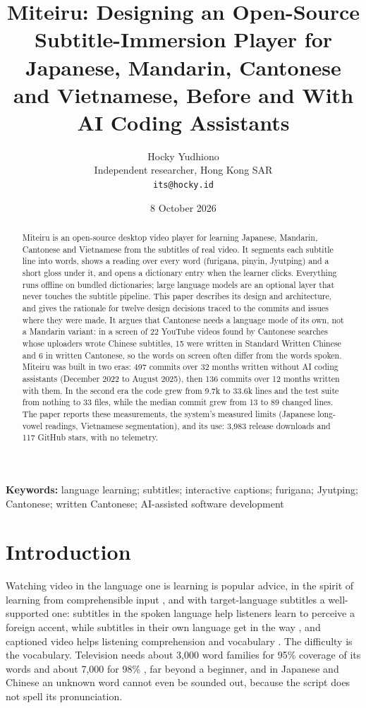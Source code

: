 ﻿\documentclass[11pt,a4paper]{article}
\title{Miteiru: Designing an Open-Source Subtitle-Immersion Player for Japanese, Mandarin, Cantonese and Vietnamese, Before and With AI Coding Assistants}
\author{Hocky Yudhiono\\[2pt]\small Independent researcher, Hong Kong SAR\\\small\texttt{its@hocky.id}}
\date{8 October 2026}
\begin{document}
\maketitle

\begin{abstract}
Miteiru is an open-source desktop video player for learning Japanese, Mandarin, Cantonese and Vietnamese from the subtitles of real video. It segments each subtitle line into words, shows a reading over every word (furigana, pinyin, Jyutping) and a short gloss under it, and opens a dictionary entry when the learner clicks. Everything runs offline on bundled dictionaries; large language models are an optional layer that never touches the subtitle pipeline. This paper describes its design and architecture, and gives the rationale for twelve design decisions traced to the commits and issues where they were made. It argues that Cantonese needs a language mode of its own, not a Mandarin variant: in a screen of 22 YouTube videos found by Cantonese searches whose uploaders wrote Chinese subtitles, 15 were written in Standard Written Chinese and 6 in written Cantonese, so the words on screen often differ from the words spoken. Miteiru was built in two eras: 497 commits over 32 months written without AI coding assistants (December 2022 to August 2025), then 136 commits over 12 months written with them. In the second era the code grew from 9.7k to 33.6k lines and the test suite from nothing to 33 files, while the median commit grew from 13 to 89 changed lines. The paper reports these measurements, the system's measured limits (Japanese long-vowel readings, Vietnamese segmentation), and its use: 3,983 release downloads and 117 GitHub stars, with no telemetry.
\end{abstract}

\noindent\textbf{Keywords:} language learning; subtitles; interactive captions; furigana; Jyutping; Cantonese; written Cantonese; AI-assisted software development

\section{Introduction}

Watching video in the language one is learning is popular advice, in the spirit of learning from comprehensible input \citep{krashen1985input}, and with target-language subtitles a well-supported one: subtitles in the spoken language help listeners learn to perceive a foreign accent, while subtitles in their own language get in the way \citep{mitterer2009foreign}, and captioned video helps listening comprehension and vocabulary \citep{monteroperez2013captioned,vanderplank2016captioned}. The difficulty is the vocabulary. Television needs about 3,000 word families for 95\% coverage of its words and about 7,000 for 98\% \citep{webb2009vocabulary}, far beyond a beginner, and in Japanese and Chinese an unknown word cannot even be sounded out, because the script does not spell its pronunciation.
\end{document}
